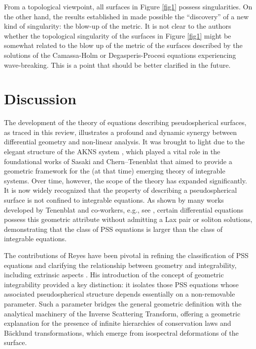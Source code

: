 \documentclass{cimart}
\begin{document}
\begin{remark}
From a topological viewpoint, all surfaces in Figure \ref{fig1} possess singularities. On the other hand, the results established in \cite{freire-ch,freire-dp} made possible the ``discovery'' of a new kind of singularity: the blow-up of the metric. It is not clear to the authors whether the topological singularity of the surfaces in Figure \ref{fig1} might be somewhat related to the blow up of the metric of the surfaces described by the solutions of the Camassa-Holm or Degasperis-Procesi equations experiencing wave-breaking. This is a point that should be better clarified in the future.
\end{remark}


\section{Discussion}

The development of the theory of equations describing pseudospherical surfaces, as traced in this review, illustrates a profound and dynamic synergy between differential geometry and non-linear analysis. It was brought to light due to the elegant structure of the AKNS system \cite{akns}, which played a vital role in the foundational works of Sasaki \cite{sasaki} and Chern–Tenenblat \cite{chern} that aimed to provide a geometric framework for the (at that time) emerging theory of integrable systems. Over time, however, the scope of the theory has expanded significantly. It is now widely recognized that the property of describing a pseudospherical surface is not confined to integrable equations. As shown by many works developed by Tenenblat and co-workers, e.g., see \cite{tarcisio}, certain differential equations possess this geometric attribute without admitting a Lax pair or soliton solutions, demonstrating that the class of PSS equations is larger than the class of integrable equations.

The contributions of Reyes \cite{reyes2000jmp,reyes2000,reyes2002,reyes2006-sel,reyes2006-jde,reyes2011,benson} have been pivotal in refining the classification of PSS equations and clarifying the relationship between geometry and integrability, including extrinsic aspects \cite{reyes2000jmp,benson}. His introduction of the concept of geometric integrability provided a key distinction: it isolates those PSS equations whose associated pseudospherical structure depends essentially on a non-removable parameter. Such a parameter bridges the general geometric definition with the analytical machinery of the Inverse Scattering Transform, offering a geometric explanation for the presence of infinite hierarchies of conservation laws and Bäcklund transformations, which emerge from isospectral deformations of the surface.
\end{document}
